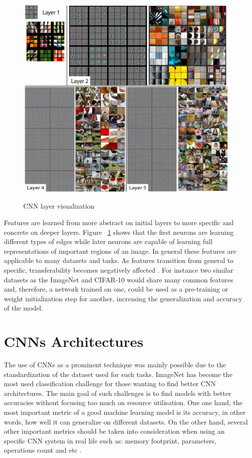 \begin{figure}[!h]
	\centering
	\includegraphics[scale=0.6]{layer_vis.png}
	\caption{CNN layer visualization}
	\cite{zeiler2014visualizing}
	\label{fig:conv_layer_vis}
\end{figure}

Features are learned from more abstract on initial layers to more specific and concrete on deeper layers. Figure ~\ref{fig:conv_layer_vis} shows that the first neurons are learning different types of edges while later neurons are capable of learning full representations of important regions of an image. In general these features are applicable to many datasets and tasks. As features transition from general to specific, transferability becomes negatively affected \cite{yosinski2014transferable}. For instance two similar datasets as the ImageNet and CIFAR-10 would share many common features and, therefore, a network trained on one, could be used as a pre-training or weight initialization step for another, increasing the generalization and accuracy of the model.
\section{CNNs Architectures}

The use of CNNs as a prominent technique was mainly possible due to the standardization of the dataset used for such tasks. ImageNet has become the most used classification challenge for those wanting to find better CNN architectures. The main goal of such challenges is to find models with better accuracies without focusing too much on resource utilisation. One one hand, the most important metric of a good machine learning model is its accuracy, in other words, how well it can generalize on different datasets. On the other hand, several other important metrics should be taken into consideration when using an specific CNN system in real life such as: memory footprint, parameters, operations count and etc \cite{canziani2016analysis}.

